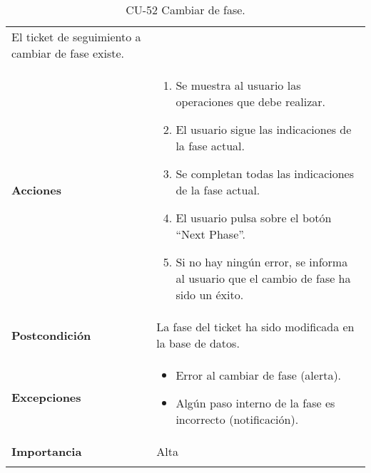 \begin{longtable}[]{@{}ll@{}}
\begin{minipage}[t]{0.73\columnwidth}
El ticket de seguimiento a cambiar de fase existe.\strut
\end{minipage}\tabularnewline
\begin{minipage}[t]{0.21\columnwidth}\raggedright
\textbf{Acciones}\strut
\end{minipage} & \begin{minipage}[t]{0.73\columnwidth}\raggedright
\begin{enumerate}
\def\labelenumi{\arabic{enumi}.}
\tightlist
\item
  Se muestra al usuario las operaciones que debe realizar.
\item
  El usuario sigue las indicaciones de la fase actual.
\item
  Se completan todas las indicaciones de la fase actual.
\item
  El usuario pulsa sobre el botón ``Next Phase''.
\item
  Si no hay ningún error, se informa al usuario que el cambio de fase ha
  sido un éxito.
\end{enumerate}\strut
\end{minipage}\tabularnewline
\begin{minipage}[t]{0.21\columnwidth}\raggedright
\textbf{Postcondición}\strut
\end{minipage} & \begin{minipage}[t]{0.73\columnwidth}\raggedright
La fase del ticket ha sido modificada en la base de datos.\strut
\end{minipage}\tabularnewline
\begin{minipage}[t]{0.21\columnwidth}\raggedright
\textbf{Excepciones}\strut
\end{minipage} & \begin{minipage}[t]{0.73\columnwidth}\raggedright
\begin{itemize}
\tightlist
\item
  Error al cambiar de fase (alerta).
\item
  Algún paso interno de la fase es incorrecto (notificación).
\end{itemize}\strut
\end{minipage}\tabularnewline
\begin{minipage}[t]{0.21\columnwidth}\raggedright
\textbf{Importancia}\strut
\end{minipage} & \begin{minipage}[t]{0.73\columnwidth}\raggedright
Alta\strut
\end{minipage}\tabularnewline
\bottomrule
\caption{CU-52 Cambiar de fase.}
\end{longtable}

